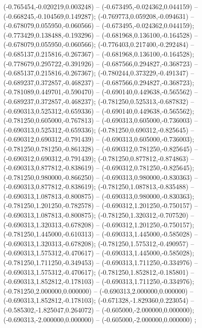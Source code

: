  (-0.765454,-0.020219,0.003248) -- (-0.673495,-0.024362,0.044159) -- (-0.668245,-0.104569,0.149287);
 (-0.769773,0.059208,-0.094631) -- (-0.678079,0.055950,-0.060566) -- (-0.673495,-0.024362,0.044159);
 (-0.773429,0.138488,-0.193296) -- (-0.681968,0.136100,-0.164528) -- (-0.678079,0.055950,-0.060566);
 (-0.776403,0.217400,-0.292484) -- (-0.685137,0.215816,-0.267367) -- (-0.681968,0.136100,-0.164528);
 (-0.778679,0.295722,-0.391926) -- (-0.687566,0.294827,-0.368723) -- (-0.685137,0.215816,-0.267367);
 (-0.780244,0.373229,-0.491347) -- (-0.689237,0.372857,-0.468237) -- (-0.687566,0.294827,-0.368723);
 (-0.781089,0.449701,-0.590470) -- (-0.690140,0.449638,-0.565562) -- (-0.689237,0.372857,-0.468237);
 (-0.781250,0.525313,-0.687832) -- (-0.690313,0.525312,-0.659336) -- (-0.690140,0.449638,-0.565562);
 (-0.781250,0.605000,-0.767813) -- (-0.690313,0.605000,-0.736003) -- (-0.690313,0.525312,-0.659336);
 (-0.781250,0.690312,-0.825645) -- (-0.690312,0.690312,-0.791439) -- (-0.690313,0.605000,-0.736003);
 (-0.781250,0.781250,-0.861328) -- (-0.690312,0.781250,-0.825645) -- (-0.690312,0.690312,-0.791439);
 (-0.781250,0.877812,-0.874863) -- (-0.690313,0.877812,-0.838619) -- (-0.690312,0.781250,-0.825645);
 (-0.781250,0.980000,-0.866250) -- (-0.690313,0.980000,-0.830363) -- (-0.690313,0.877812,-0.838619);
 (-0.781250,1.087813,-0.835488) -- (-0.690313,1.087813,-0.800875) -- (-0.690313,0.980000,-0.830363);
 (-0.781250,1.201250,-0.782578) -- (-0.690312,1.201250,-0.750157) -- (-0.690313,1.087813,-0.800875);
 (-0.781250,1.320312,-0.707520) -- (-0.690313,1.320313,-0.678208) -- (-0.690312,1.201250,-0.750157);
 (-0.781250,1.445000,-0.610313) -- (-0.690313,1.445000,-0.585028) -- (-0.690313,1.320313,-0.678208);
 (-0.781250,1.575312,-0.490957) -- (-0.690313,1.575312,-0.470617) -- (-0.690313,1.445000,-0.585028);
 (-0.781250,1.711250,-0.349453) -- (-0.690313,1.711250,-0.334976) -- (-0.690313,1.575312,-0.470617);
 (-0.781250,1.852812,-0.185801) -- (-0.690313,1.852812,-0.178103) -- (-0.690313,1.711250,-0.334976);
 (-0.781250,2.000000,0.000000) -- (-0.690313,2.000000,0.000000) -- (-0.690313,1.852812,-0.178103);
 (-0.671328,-1.829360,0.223054) -- (-0.585302,-1.825047,0.264072) -- (-0.605000,-2.000000,0.000000);
 (-0.690313,-2.000000,0.000000) -- (-0.605000,-2.000000,0.000000) ;
